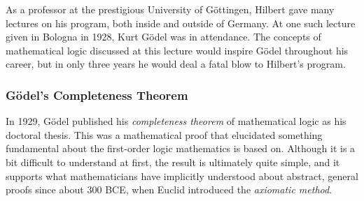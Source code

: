 As a professor at the prestigious University of G\"ottingen, Hilbert gave many lectures on his program, both inside and outside of Germany. At one such lecture given in Bologna in 1928, Kurt G\"odel was in attendance. The concepts of mathematical logic discussed at this lecture would inspire G\"odel throughout his career, but in only three years he would deal a fatal blow to Hilbert's program. \\




\subsubsection{G\"odel's Completeness Theorem}

In 1929, G\"odel published his \textit{completeness theorem} of mathematical logic as his doctoral thesis. This was a mathematical proof that elucidated something fundamental about the first-order logic mathematics is based on. Although it is a bit difficult to understand at first, the result is ultimately quite simple, and it supports what mathematicians have implicitly understood about abstract, general proofs since about 300 \textsc{BCE}, when Euclid introduced the \textit{axiomatic method}. \\


